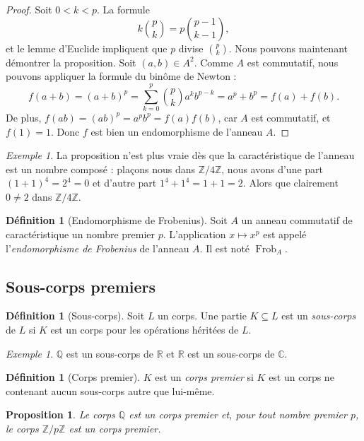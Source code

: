 \documentclass[a4paper, titlepage]{article}
\newtheorem{prop}[theo]{Proposition}
\theoremstyle{definition}
\newtheorem{defi}[theo]{Définition}
\theoremstyle{remark}
\newtheorem{exem}[theo]{Exemple}
\def\Z{\mathbb Z}
\def\Q{\mathbb Q}
\def\R{\mathbb R}
\def\C{\mathbb C}
\def\frob{\operatorname{Frob}}
\begin{document}
\begin{proof}
Soit $0 < k < p$. La formule 
$$k\binom{p}{k} = p\binom{p-1}{k-1},$$
et le lemme d'Euclide impliquent que $p$ divise $\binom{p}{k}$. Nous pouvons maintenant démontrer la proposition. Soit $(a,b) \in A^2$. Comme $A$ est commutatif, nous pouvons appliquer la formule du binôme de Newton :
$$f(a+b)=(a+b)^p = \sum_{k=0}^p \binom{p}{k} a^kb^{p-k} = a^p + b^p=f(a)+f(b).$$
De plus, $f(ab)=(ab)^p = a^pb^p=f(a)f(b)$, car $A$ est commutatif, et $f(1) = 1$. Donc $f$ est bien un endomorphisme de l'anneau $A$.
\end{proof}

\begin{exem}
La proposition n'est plus vraie dès que la caractéristique de l'anneau est un nombre composé : plaçons nous dans $\Z/4\Z$, nous avons d'une part $(1 + 1)^4 = 2^4 = 0$ et d'autre part $1^4 + 1^4 = 1+1 = 2$. Alors que clairement $0\neq 2$ dans $\Z/4\Z$.
\end{exem}

\begin{defi}[Endomorphisme de Frobenius]
Soit $A$ un anneau commutatif de caractéristique un nombre premier $p$. L'application $x \mapsto x^p$ est appelé l'\textit{endomorphisme de Frobenius} de l'anneau $A$. Il est noté $\frob_A$.
\end{defi}

\subsection{Sous-corps premiers}

\begin{defi}[Sous-corps]
Soit $L$ un corps. Une partie $K \subseteq L$ est un \textit{sous-corps} de $L$ si $K$ est un corps pour les opérations héritées de $L$.
\end{defi}

\begin{exem}
$\Q$ est un sous-corps de $\R$ et $\R$ est un sous-corps de $\C$.
\end{exem}

\begin{defi}[Corps premier]
$K$ est un \textit{corps premier} si $K$ est un corps ne contenant aucun sous-corps autre que lui-même.
\end{defi}

\begin{prop}
Le corps $\Q$ est un corps premier et, pour tout nombre premier $p$, le corps $\Z/p\Z$ est un corps premier.
\end{prop}
\end{document}
